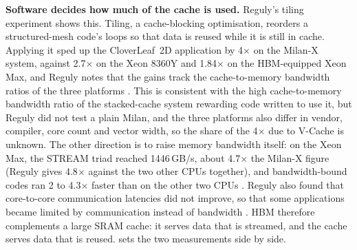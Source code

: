 \textbf{Software decides how much of the cache is used.} Reguly's tiling experiment shows this. Tiling, a cache-blocking optimisation, reorders a structured-mesh code's loops so that data is reused while it is still in cache. Applying it sped up the CloverLeaf~2D application by 4$\times$ on the Milan-X system, against 2.7$\times$ on the Xeon 8360Y and 1.84$\times$ on the HBM-equipped Xeon Max, and Reguly notes that the gains track the cache-to-memory bandwidth ratios of the three platforms \cite{regulyComparativeEvaluationBandwidthbound2023}. This is consistent with the high cache-to-memory bandwidth ratio of the stacked-cache system rewarding code written to use it, but Reguly did not test a plain Milan, and the three platforms also differ in vendor, compiler, core count and vector width, so the share of the 4$\times$ due to V-Cache is unknown. The other direction is to raise memory bandwidth itself: on the Xeon Max, the STREAM triad reached 1446\,GB/s, about 4.7$\times$ the Milan-X figure (Reguly gives 4.8$\times$ against the two other CPUs together), and bandwidth-bound codes ran 2 to 4.3$\times$ faster than on the other two CPUs \cite{regulyComparativeEvaluationBandwidthbound2023}. Reguly also found that core-to-core communication latencies did not improve, so that some applications became limited by communication instead of bandwidth \cite{regulyComparativeEvaluationBandwidthbound2023}. HBM therefore complements a large SRAM cache: it serves data that is streamed, and the cache serves data that is reused.  sets the two measurements side by side.

